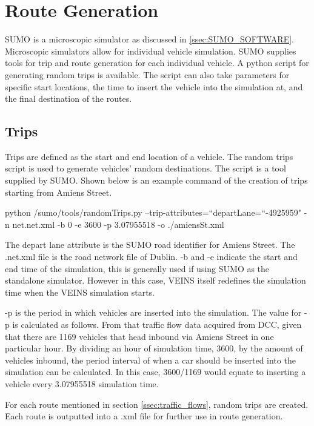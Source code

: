 \section{Route Generation}
\ac{SUMO} is a microscopic simulator as discussed in \ref{ssec:SUMO_SOFTWARE}. Microscopic simulators allow for individual vehicle simulation. \ac{SUMO} supplies tools for trip and route generation for each individual vehicle. A python script for generating random trips is available. The script can also take parameters for specific start locations, the time to insert the vehicle into the simulation at, and the final destination of the routes. 

\subsection{Trips}\label{ssec:trips}
Trips are defined as the start and end location of a vehicle. The random trips script is used to generate vehicles' random destinations. The script is a tool supplied by \ac{SUMO}. Shown below is an example command of the creation of trips starting from Amiens Street.

\begin{displayquote}
    python /sumo/tools/randomTrips.py --trip-attributes=``departLane=``-4925959" -n net.net.xml -b 0 -e 3600 -p 3.07955518 -o ./amiensSt.xml
\end{displayquote}

The depart lane attribute is the SUMO road identifier for Amiens Street. The .net.xml file is the road network file of Dublin. -b and -e indicate the start and end time of the simulation, this is generally used if using \ac{SUMO} as the standalone simulator. However in this case, VEINS itself redefines the simulation time when the VEINS simulation starts.

-p is the period in which vehicles are inserted into the simulation. The value for -p is calculated as follows. From that traffic flow data acquired from DCC, given that there are 1169 vehicles that head inbound via Amiens Street in one particular hour. By dividing an hour of simulation time, 3600, by the amount of vehicles inbound, the period interval of when a car should be inserted into the simulation can be calculated. In this case, 3600/1169 would equate to inserting a vehicle every 3.07955518 simulation time.

For each route mentioned in section \ref{ssec:traffic_flows}, random trips are created. Each route is outputted into a .xml file for further use in route generation.

